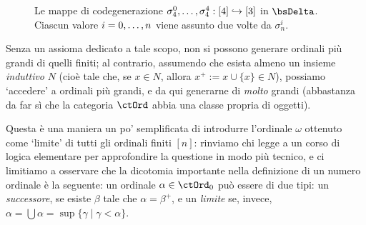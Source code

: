 \begin{figure}
\begin{center}
	\end{center}
	\caption{Le mappe di codegenerazione \(\sigma_4^0,\dots,\sigma_4^4 : [4]\hookrightarrow [3]\) in \(\bsDelta\). Ciascun valore $i=\iter[0] n$ viene assunto due volte da $\sigma_n^i$.}
	\label{fig:cofa}
\end{figure}
\begin{remark}
	Senza un assioma dedicato a tale scopo, non si possono generare ordinali più grandi di quelli finiti; al contrario, assumendo che esista almeno un insieme \emph{induttivo} \(N\) (cioè tale che, se \(x\in N\), allora \(x^+:=x\cup\{x\}\in N\)), possiamo `accedere' a ordinali più grandi, e da qui generarne di \emph{molto} grandi (abbastanza da far sì che la categoria \(\ctOrd\) abbia una classe propria di oggetti).

	Questa è una maniera un po' semplificata di introdurre l'ordinale \(\omega\) ottenuto come `limite' di tutti gli ordinali finiti \([n]\): rinviamo chi legge a un corso di logica elementare per approfondire la questione in modo più tecnico, e ci limitiamo a osservare che la dicotomia importante nella definizione di un numero ordinale è la seguente: un ordinale \(\alpha\in\ctOrd_0\) può essere di due tipi: un \emph{successore}, se esiste \(\beta\) tale che \(\alpha=\beta^+\), e un \emph{limite} se, invece, \(\alpha=\bigcup\alpha=\sup\{\gamma\mid \gamma < \alpha\}\).
\end{remark}
